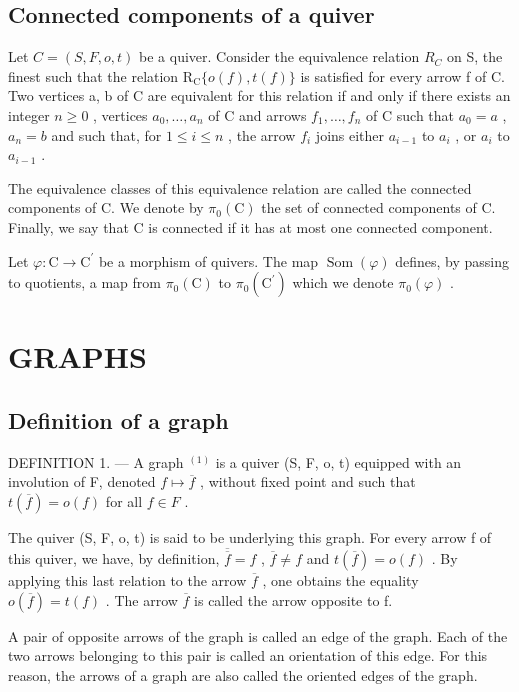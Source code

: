 \subsection{Connected components of a quiver}

Let \(C = (S, F, o, t)\) be a quiver. Consider the equivalence relation \(R_{C}\) on S, the finest such that the relation \(\mathrm{R}_{\mathrm{C}}\{o(f), t(f)\}\) is satisfied for every arrow f of C. Two vertices a, b of C are equivalent for this relation if and only if there exists an integer \(n \geqslant 0\) , vertices \(a_{0}, \ldots, a_{n}\) of C and arrows \(f_{1}, \ldots, f_{n}\) of C such that \(a_{0} = a\) , \(a_{n} = b\) and such that, for \(1 \leqslant i \leqslant n\) , the arrow \(f_{i}\) joins either \(a_{i-1}\) to \(a_{i}\) , or \(a_{i}\) to \(a_{i-1}\) .

The equivalence classes of this equivalence relation are called the connected components of C. We denote by \(\pi_0(\mathrm{C})\) the set of connected components of C. Finally, we say that C is connected if it has at most one connected component.

Let \(\varphi\colon\mathrm{C}\to\mathrm{C}^{\prime}\) be a morphism of quivers. The map \(\operatorname{Som}(\varphi)\) defines, by passing to quotients, a map from \(\pi_{0}(\mathrm{C})\) to \(\pi_{0}(\mathrm{C}^{\prime})\) which we denote \(\pi_{0}(\varphi)\) .

\section{GRAPHS}

\subsection{Definition of a graph}

DEFINITION 1. --- A graph \(^{(1)}\) is a quiver (S, F, o, t) equipped with an involution of F, denoted \(f \mapsto \overline{f}\) , without fixed point and such that \(t(\overline{f}) = o(f)\) for all \(f \in F\) .

The quiver (S, F, o, t) is said to be underlying this graph. For every arrow f of this quiver, we have, by definition, \(\overline{\overline{f}} = f\) , \(\overline{f} \neq f\) and \(t(\overline{f}) = o(f)\) . By applying this last relation to the arrow \(\overline{f}\) , one obtains the equality \(o(\overline{f}) = t(f)\) . The arrow \(\overline{f}\) is called the arrow opposite to f.

A pair of opposite arrows of the graph is called an edge of the graph. Each of the two arrows belonging to this pair is called an orientation of this edge. For this reason, the arrows of a graph are also called the oriented edges of the graph.

